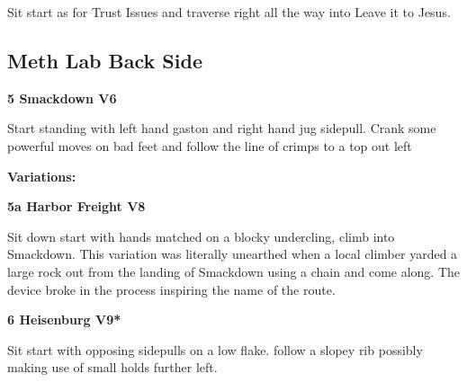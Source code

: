 \begin{multicols}{2}
\begin{adjustwidth}{0.5cm}{}
					\begin{adjustwidth}{0.5cm}{}			
					Sit start as for Trust Issues and traverse right all the way into Leave it to Jesus.
					\end{adjustwidth}
					
					
				\end{adjustwidth}
			
		


		\needspace{1.5cm}
		\subsection*{Meth Lab Back Side}\label{bf:Meth Lab Back Side}
			
		
			
			\needspace{1.5cm}
\label{rt:Smackdown}
\colorbox{RoyalBlue!20}{
\parbox{0.95\linewidth}{
\textbf{
5 Smackdown V6  
}}}

			\begin{adjustwidth}{0.5cm}{}			
			Start standing with left hand gaston and right hand jug sidepull. Crank some powerful moves on bad feet and follow the line of crimps to a top out left
			\end{adjustwidth}
			
				\begin{adjustwidth}{0.5cm}{}				
				\needspace{3cm}
				\textbf{Variations:} \newline
					
					\needspace{1.5cm}
\label{vr:Harbor Freight}
\colorbox{Goldenrod!50}{
\parbox{0.95\linewidth}{
\textbf{
5a Harbor Freight V8  
}}}

					\begin{adjustwidth}{0.5cm}{}			
					Sit down start with hands matched on a blocky undercling, climb into Smackdown. This variation was literally unearthed when a local climber yarded a large rock out from the landing of Smackdown using a chain and come along. The device broke in the process inspiring the name of the route.
					\end{adjustwidth}
					
					
				\end{adjustwidth}
			
			
			\needspace{1.5cm}
\label{rt:Heisenburg}
\colorbox{Goldenrod!50}{
\parbox{0.95\linewidth}{
\textbf{
6 Heisenburg V9*  
}}}

			\begin{adjustwidth}{0.5cm}{}			
			Sit start with opposing sidepulls on a low flake. follow a slopey rib possibly making use of small holds further left.
			\end{adjustwidth}
			

\end{multicols}
